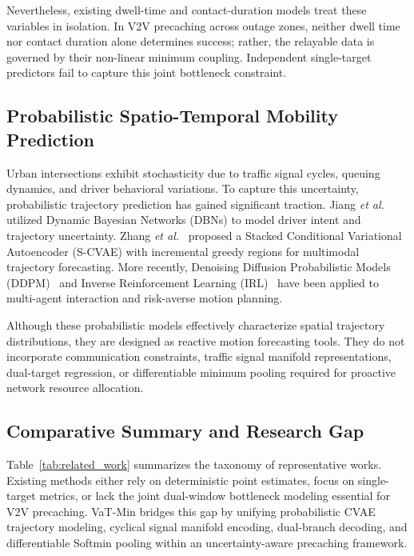 \documentclass[journal]{IEEEtran}
\begin{document}
Nevertheless, existing dwell-time and contact-duration models treat these variables in isolation. In V2V precaching across outage zones, neither dwell time nor contact duration alone determines success; rather, the relayable data is governed by their non-linear minimum coupling. Independent single-target predictors fail to capture this joint bottleneck constraint.

\subsection{Probabilistic Spatio-Temporal Mobility Prediction}
Urban intersections exhibit stochasticity due to traffic signal cycles, queuing dynamics, and driver behavioral variations. To capture this uncertainty, probabilistic trajectory prediction has gained significant traction. Jiang \textit{et al.}~\cite{Jiang2023} utilized Dynamic Bayesian Networks (DBNs) to model driver intent and trajectory uncertainty. Zhang \textit{et al.}~\cite{YZhang2024} proposed a Stacked Conditional Variational Autoencoder (S-CVAE) with incremental greedy regions for multimodal trajectory forecasting. More recently, Denoising Diffusion Probabilistic Models (DDPM)~\cite{CLi2025} and Inverse Reinforcement Learning (IRL)~\cite{Geng2023} have been applied to multi-agent interaction and risk-averse motion planning.

Although these probabilistic models effectively characterize spatial trajectory distributions, they are designed as reactive motion forecasting tools. They do not incorporate communication constraints, traffic signal manifold representations, dual-target regression, or differentiable minimum pooling required for proactive network resource allocation.

\subsection{Comparative Summary and Research Gap}
Table~\ref{tab:related_work} summarizes the taxonomy of representative works. Existing methods either rely on deterministic point estimates, focus on single-target metrics, or lack the joint dual-window bottleneck modeling essential for V2V precaching. VaT-Min bridges this gap by unifying probabilistic CVAE trajectory modeling, cyclical signal manifold encoding, dual-branch decoding, and differentiable Softmin pooling within an uncertainty-aware precaching framework.
\end{document}
